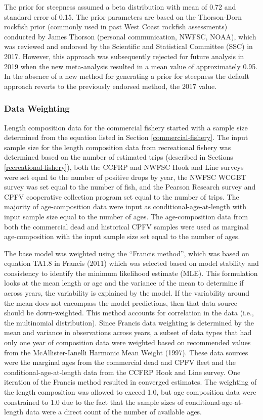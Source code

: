 \documentclass[11pt,
  english,
  letterpaper,
]{article}
\begin{document}
The prior for steepness assumed a beta distribution with mean of 0.72 and standard error of 0.15. The prior parameters are based on the Thorson-Dorn rockfish prior (commonly used in past West Coast rockfish assessments) conducted by James Thorson (personal communication, NWFSC, NOAA), which was reviewed and endorsed by the Scientific and Statistical Committee (SSC) in 2017. However, this approach was subsequently rejected for future analysis in 2019 when the new meta-analysis resulted in a mean value of approximately 0.95. In the absence of a new method for generating a prior for steepness the default approach reverts to the previously endorsed method, the 2017 value.

\hypertarget{data-weighting}{%
\subsubsection{Data Weighting}\label{data-weighting}}

Length composition data for the commercial fishery started with a sample size determined from the equation listed in Section \ref{commercial-fishery}. The input sample size for the length composition data from recreational fishery was determined based on the number of estimated trips (described in Sections \ref{recreational-fishery}), both the CCFRP and NWFSC Hook and Line surveys were set equal to the number of positive drops by year, the NWFSC WCGBT survey was set equal to the number of fish, and the Pearson Research survey and CPFV cooperative collection program set equal to the number of trips. The majority of age-composition data were input as conditional-age-at-length with input sample size equal to the number of ages. The age-composition data from both the commercial dead and historical CPFV samples were used as marginal age-composition with the input sample size set equal to the number of ages.

The base model was weighted using the ``Francis method'', which was based on equation TA1.8 in Francis (2011) which was selected based on model stability and consistency to identify the minimum likelihood estimate (MLE). This formulation looks at the mean length or age and the variance of the mean to determine if across years, the variability is explained by the model. If the variability around the mean does not encompass the model predictions, then that data source should be down-weighted. This method accounts for correlation in the data (i.e., the multinomial distribution). Since Francis data weighting is determined by the mean and variance in observations across years, a subset of data types that had only one year of composition data were weighted based on recommended values from the McAllister-Ianelli Harmonic Mean Weight (1997). These data sources were the marginal ages from the commercial dead and CPFV fleet and the conditional-age-at-length data from the CCFRP Hook and Line survey. One iteration of the Francis method resulted in converged estimates. The weighting of the length composition was allowed to exceed 1.0, but age composition data were constrained to 1.0 due to the fact that the sample sizes of conditional-age-at-length data were a direct count of the number of available ages.
\end{document}
